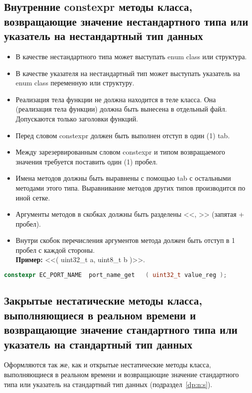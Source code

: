 \subsection{Внутренние constexpr методы класса, возвращающие значение нестандартного типа или указатель на нестандартный тип данных}\label{zp:constexpr:n}
\begin{itemize}
	\item В качестве нестандартного типа может выступать enum class или структура.
	\item В качестве указателя на нестандартный тип может выступать указатель на enum class переменную или структуру.
	\item Реализация тела функции не должна находится в теле класса. Она (реализация тела функции) должна быть вынесена в отдельный файл. Допускаются только заголовки функций.
	\item Перед словом constexpr должен быть выполнен отступ в один (1) tab.
	\item Между зарезервированным словом constexpr и типом возвращаемого значения требуется поставить один (1) пробел.
	\item Имена методов должны быть выравнены с помощью tab с остальными методами этого типа. Выравнивание методов других типов производится по иной сетке.
	\item Аргументы методов в скобках должны быть разделены <<, >> (запятая + пробел).
	\item Внутри скобок перечисления аргументов метода должен быть отступ в 1 пробел с каждой стороны.\\\textbf{Пример: } <<( uint32\_t a, uint8\_t b )>>.
\end{itemize}\begin{lstlisting}[language=C++, frame=tlBR, basicstyle=\fontsize{10}{10}\ttfamily]
	constexpr EC_PORT_NAME	port_name_get	( uint32_t value_reg );
\end{lstlisting}

\subsection{Закрытые нестатические методы класса, выполняющиеся в реальном времени и возвращающие значение стандартного типа или указатель на стандартный тип данных}\label{zp:n:s}
Оформляются так же, как и открытые нестатические методы класса, выполняющиеся в реальном времени и возвращающие значение стандартного типа или указатель на стандартный тип данных (подраздел~\ref{dp:n:s}).

